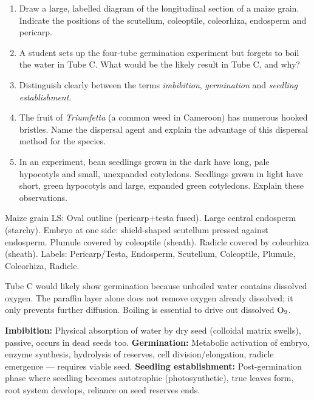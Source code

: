 \documentclass[11pt]{article}
\begin{document}
\begin{exercice}
\begin{enumerate}
\item Draw a large, labelled diagram of the longitudinal section of a maize grain. Indicate the positions of the scutellum, coleoptile, coleorhiza, endosperm and pericarp.
\item A student sets up the four-tube germination experiment but forgets to boil the water in Tube C. What would be the likely result in Tube C, and why?
\item Distinguish clearly between the terms \emph{imbibition}, \emph{germination} and \emph{seedling establishment}.
\item The fruit of \emph{Triumfetta} (a common weed in Cameroon) has numerous hooked bristles. Name the dispersal agent and explain the advantage of this dispersal method for the species.
\item In an experiment, bean seedlings grown in the dark have long, pale hypocotyls and small, unexpanded cotyledons. Seedlings grown in light have short, green hypocotyls and large, expanded green cotyledons. Explain these observations.
\end{enumerate}
\end{exercice}

\begin{corrige}[Exercise 1]
Maize grain LS: Oval outline (pericarp+testa fused). Large central endosperm (starchy). Embryo at one side: shield-shaped scutellum pressed against endosperm. Plumule covered by coleoptile (sheath). Radicle covered by coleorhiza (sheath). Labels: Pericarp/Testa, Endosperm, Scutellum, Coleoptile, Plumule, Coleorhiza, Radicle.
\end{corrige}

\begin{corrige}[Exercise 2]
Tube C would likely show germination because unboiled water contains dissolved oxygen. The paraffin layer alone does not remove oxygen already dissolved; it only prevents further diffusion. Boiling is essential to drive out dissolved $\ce{O2}$.
\end{corrige}

\begin{corrige}[Exercise 3]
\textbf{Imbibition:} Physical absorption of water by dry seed (colloidal matrix swells), passive, occurs in dead seeds too. \textbf{Germination:} Metabolic activation of embryo, enzyme synthesis, hydrolysis of reserves, cell division/elongation, radicle emergence — requires viable seed. \textbf{Seedling establishment:} Post-germination phase where seedling becomes autotrophic (photosynthetic), true leaves form, root system develops, reliance on seed reserves ends.
\end{corrige}
\end{document}
